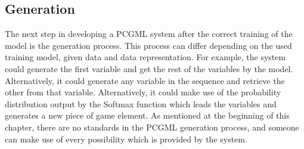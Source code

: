\documentclass[MGS,Master,english]{twbook}%
\begin{document}
\subsection{Generation}
The next step in developing a PCGML system after the correct training of the model is the generation process. This process can differ depending on the used training model, given data and data representation. For example, the system could generate the first variable and get the rest of the variables by the model. Alternatively, it could generate any variable in the sequence and retrieve the other from that variable. Alternatively, it could make use of the probability distribution output by the Softmax function which leads the variables and generates a new piece of game element. As mentioned at the beginning of this chapter, there are no standards in the PCGML generation process, and someone can make use of every possibility which is provided by the system.
 
%
%
\clearpage
\end{document}
